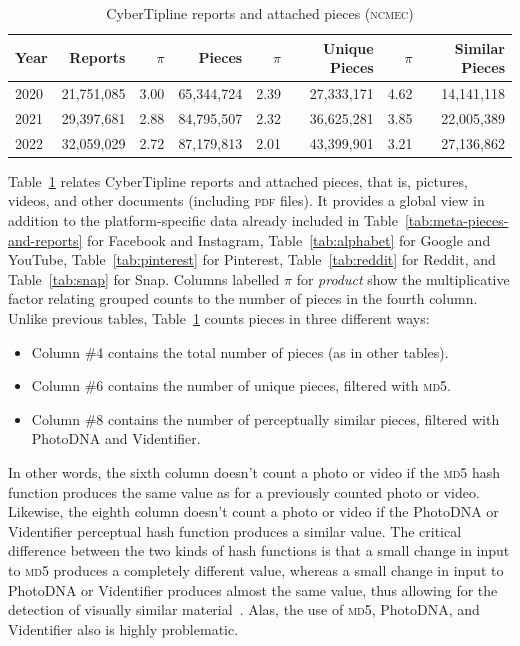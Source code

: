 \documentclass[nonacm,screen]{acmart}
\newcommand\V[1]{\textsc{\MakeLowercase{#1}}}
\begin{document}
\begin{itemize}
{\begin{table}
\centering\libertineLF
\caption{CyberTipline reports and attached pieces (\V{NCMEC})}
\label{tab:reports-pieces}
\begin{tabular}{l|rr|r|rr|rr}
\textbf{Year} & \textbf{Reports} & $\pi$ & \textbf{Pieces}
& $\pi$ & \textbf{Unique Pieces} & $\pi$ & \textbf{Similar Pieces} \\ \hline
2020 & 21,751,085 & 3.00 & 65,344,724 & 2.39 & 27,333,171 & 4.62 & 14,141,118 \\
2021 & 29,397,681 & 2.88 & 84,795,507 & 2.32 & 36,625,281 & 3.85 & 22,005,389 \\
2022 & 32,059,029 & 2.72 & 87,179,813 & 2.01 & 43,399,901 & 3.21 & 27,136,862 \\
\end{tabular}
\end{table}

Table~\ref{tab:reports-pieces} relates CyberTipline reports and attached pieces,
that is, pictures, videos, and other documents (including \V{PDF} files). It
provides a global view in addition to the platform-specific data already
included in Table~\ref{tab:meta-pieces-and-reports} for Facebook and Instagram,
Table~\ref{tab:alphabet} for Google and YouTube, Table~\ref{tab:pinterest} for
Pinterest, Table~\ref{tab:reddit} for Reddit, and Table~\ref{tab:snap} for Snap.
Columns labelled $\pi$ for \emph{product} show the multiplicative factor
relating grouped counts to the number of pieces in the fourth column. Unlike
previous tables, Table~\ref{tab:reports-pieces} counts pieces in three different
ways:
\begin{itemize}
    \item Column \#4 contains the total number of pieces (as in other tables).
    \item Column \#6 contains the number of unique pieces, filtered with \V{MD5}.
    \item Column \#8 contains the number of perceptually similar pieces,
    filtered with PhotoDNA and Videntifier.
\end{itemize}
In other words, the sixth column doesn't count a photo or video if the \V{MD5}
hash function produces the same value as for a previously counted photo or
video. Likewise, the eighth column doesn't count a photo or video if the
PhotoDNA or Videntifier perceptual hash function produces a similar value. The
critical difference between the two kinds of hash functions is that a small
change in input to \V{MD5} produces a completely different value, whereas a
small change in input to PhotoDNA or Videntifier produces almost the same value,
thus allowing for the detection of visually similar material~\cite{Farid2021}.
Alas, the use of \V{MD5}, PhotoDNA, and Videntifier also is highly problematic.

}
\end{itemize}
\end{document}
